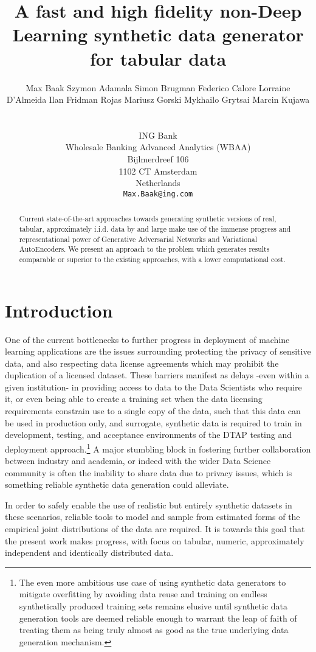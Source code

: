\documentclass{article}
\title{A fast and high fidelity non-Deep Learning synthetic data generator for tabular data}
\author{%
  Max Baak
   \And
Szymon Adamala
   \And
Simon Brugman
   \And
Federico Calore
   \And
Lorraine D'Almeida
   \And
Ilan Fridman Rojas
   \And
Mariusz Gorski
   \And
Mykhailo Grytsai
   \And
Marcin Kujawa \\ \\ \\
 ING Bank\\
  Wholesale Banking Advanced Analytics (WBAA)\\
  Bijlmerdreef 106\\
1102 CT Amsterdam\\ 
Netherlands\\
  \texttt{Max.Baak@ing.com} \\
}
\begin{document}
\maketitle

\begin{abstract}
  Current state-of-the-art approaches towards generating synthetic versions of real, tabular, approximately i.i.d. data by and large make use of the immense progress and representational power of Generative Adversarial Networks and Variational AutoEncoders. We present an approach to the problem which generates results comparable or superior to the existing approaches, with a lower computational cost.
\end{abstract}

\section{Introduction}

One of the current bottlenecks to further progress in deployment of machine learning applications are the issues surrounding protecting the privacy of sensitive data, and also respecting data license agreements which may prohibit the duplication of a licensed dataset. These barriers manifest as delays -even within a given institution- in providing access to data to the Data Scientists who require it, or even being able to create a training set when the data licensing requirements constrain use to a single copy of the data, such that this data can be used in production only, and surrogate, synthetic data is required to train in development, testing, and acceptance environments of the DTAP testing and deployment approach.\footnote{The even more ambitious use case of using synthetic data generators to mitigate overfitting by avoiding data reuse and training on endless synthetically produced training sets remains elusive until synthetic data generation tools are deemed reliable enough to warrant the leap of faith of treating them as being truly almost as good as the true underlying data generation mechanism.} A major stumbling block in fostering further collaboration between industry and academia, or indeed with the wider Data Science community is often the inability to share data due to privacy issues, which is something reliable synthetic data generation could alleviate. 

In order to safely enable the use of realistic but entirely synthetic datasets in these scenarios, reliable tools to model and sample from estimated forms of the empirical joint distributions of the data are required. It is towards this goal that the present work makes progress, with focus on tabular, numeric, approximately independent and identically distributed data.
\end{document}

